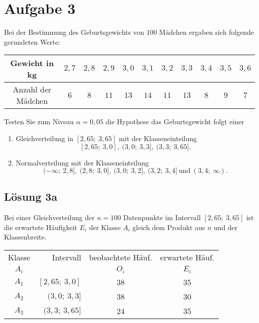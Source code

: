 \documentclass[main.tex]{subfiles}
\begin{document}
\section{Aufgabe 3}
Bei der Bestimmung des Geburtsgewichts von $100$ Mädchen ergaben sich folgende gerundeten Werte:
\begin{center}
    \begin{tabular}{c|c|c|c|c|c|c|c|c|c|c}
        Gewicht in kg & $2,7$ & $2,8$ & $2,9$ & $3,0$ & $3,1$
            & $3,2$ & $3,3$ & $3,4$ & $3,5$ & $3,6$ \\ \hline
        Anzahl der Mädchen & $6$ & $8$ & $11$ & $13$ & $14$
            & $11$ & $13$ & $8$ & $9$ & $7$
    \end{tabular}
\end{center}
Testen Sie zum Niveau $\alpha = 0,05$ die Hypothese das Geburtsgewicht folgt einer
\begin{enumerate}
    \item Gleichverteilung in $[2,65;\ 3,65]$ mit der Klasseneinteilung $$
    [2,65;\ 3,0],\ (3,0;\ 3,3],\ (3,3;\ 3,65].
    $$
    \item Normalverteilung mit der Klasseneinteilung $$
    (-\infty;\ 2,8],\ (2,8;\ 3,0],\ (3,0;\ 3,2],\ (3,2;\ 3,4]\ \text{und}\ (3,4;\ \infty).
    $$
\end{enumerate}

\subsection{Lösung 3a}
Bei einer Gleichverteilung der $n=100$ Datenpunkte im Intervall $[2,65;\ 3,65]$ ist die erwartete Häufigkeit $E_i$ der Klasse $A_i$ gleich dem Produkt aus $n$ und der Klassenbreite.

\begin{center}
    \begin{tabular}{c|r|c|c}
        Klasse & Intervall      & beobachtete Häuf. & erwartete Häuf.\\
        $A_i$  &                & $O_i$                  & $E_i$ \\
        \hline
        $A_1$  & $[2,65;\ 3,0]$ & 38                     & 35 \\
        $A_2$  & $(3,0;\ 3,3]$  & 38                     & 30 \\
        $A_3$  & $(3,3;\ 3,65]$ & 24                     & 35 \\
    \end{tabular}
\end{center}
\end{document}
